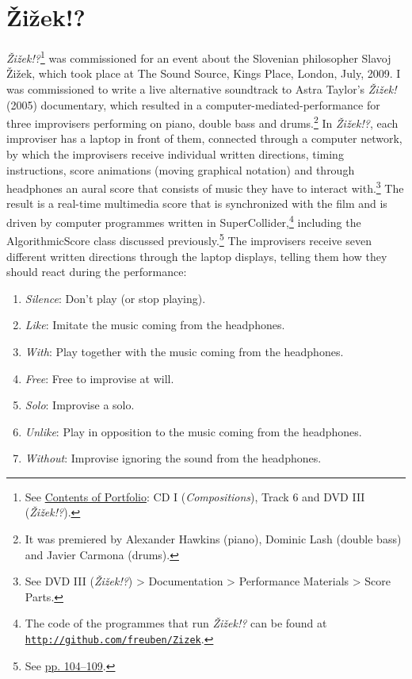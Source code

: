 \section{\v{Z}i\v{z}ek!?}

\emph{\v{Z}i\v{z}ek!?}\footnote{See \hyperlink{portfolio}{Contents of Portfolio}: CD I (\emph{Compositions}), Track 6 and DVD III (\emph{\v{Z}i\v{z}ek!?}).} was commissioned for an event about the Slovenian philosopher Slavoj \v{Z}i\v{z}ek, which took place at The Sound Source, Kings Place, London, July, 2009. I was commissioned to write a live alternative soundtrack to Astra Taylor's \emph{\v{Z}i\v{z}ek!} (2005) documentary, which resulted in a \mbox{computer-mediated-performance} for three improvisers performing on piano, double bass and drums.\footnote{It was premiered by Alexander Hawkins (piano), Dominic Lash (double bass) and Javier Carmona (drums).} In \emph{\v{Z}i\v{z}ek!?}, each improviser has a laptop in front of them, connected through a computer network, by which the improvisers receive individual written directions, timing instructions, score animations (moving graphical notation) and through headphones an aural score that consists of music they have to interact with.\footnote{See DVD III (\emph{\v{Z}i\v{z}ek!?}) \tiny \textgreater \footnotesize \hspace{0pt} Documentation \tiny \textgreater \footnotesize \hspace{0pt} Performance Materials \tiny \textgreater \footnotesize \hspace{0pt} Score Parts.} The result is a real-time multimedia score that is synchronized with the film and is driven by computer programmes written in SuperCollider,\footnote{The code of the programmes that run \emph{\v{Z}i\v{z}ek!?} can be found at \href{http://github.com/freuben/Zizek}{\texttt {http://github.com/freuben/Zizek}}.} including the AlgorithmicScore class discussed previously.\footnote{See \hyperlink{algoscore}{pp. 104--109}.} The improvisers receive seven different written directions through the laptop displays, telling them how they should react during the performance:
\begin{enumerate}
\item \emph{Silence}: Don't play (or stop playing).
\item \emph{Like}: Imitate the music coming from the headphones.
\item \emph{With}: Play together with the music coming from the headphones.
\item \emph{Free}: Free to improvise at will.
\item \emph{Solo}: Improvise a solo.
\item \emph{Unlike}: Play in opposition to the music coming from the headphones. 
\item \emph{Without}: Improvise ignoring the sound from the headphones.
\end{enumerate}
